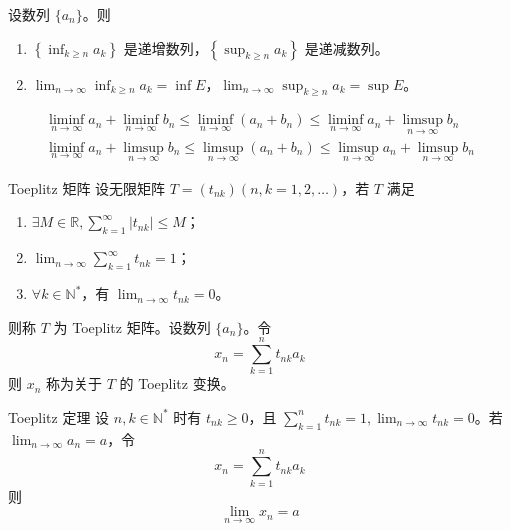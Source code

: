 \begin{theorem}
    设数列 $\{a_n\}$。则
    \begin{enumerate}[itemsep=0.5em]
        \item $\displaystyle \left\{\inf_{k \geqslant n} a_k\right\}$ 是递增数列，$\displaystyle \left\{\sup_{k \geqslant n} a_k\right\}$ 是递减数列。
        \item $\displaystyle \lim_{n \to \infty}\inf_{k \geqslant n} a_k = \inf E$，$\displaystyle \lim_{n \to \infty}\sup_{k \geqslant n} a_k = \sup E$。
    \end{enumerate}
\end{theorem}

\hfill

\begin{example}
    \begin{gather*}
        \liminf_{n \to \infty} a_n + \liminf_{n \to \infty} b_n \leqslant \liminf_{n \to \infty} (a_n + b_n) \leqslant \liminf_{n \to \infty} a_n + \limsup_{n \to \infty} b_n \\
        \liminf_{n \to \infty} a_n + \limsup_{n \to \infty} b_n \leqslant \limsup_{n \to \infty} (a_n + b_n) \leqslant \limsup_{n \to \infty} a_n + \limsup_{n \to \infty} b_n
    \end{gather*}
\end{example}

\hfill

\begin{definition}{Toeplitz 矩阵}
    设无限矩阵 $T = (t_{nk})(n, k = 1,2, \ldots)$，若 $T$ 满足
    \begin{enumerate}
        \item $\exists M \in \mathbb{R}, \displaystyle \sum_{k = 1}^{\infty} |t_{nk}| \leqslant M$；
        \item $\displaystyle \lim_{n \to \infty}\sum_{k = 1}^{\infty} t_{nk} = 1$；
        \item $\forall k \in \mathbb{N}^{*}$，有 $\displaystyle \lim_{n \to \infty} t_{nk} = 0$。
    \end{enumerate}
    则称 $T$ 为 Toeplitz 矩阵。设数列 $\{a_n\}$。令
    \[x_n = \sum_{k = 1}^{n} t_{nk}a_{k}\]
    则 $x_n$ 称为关于 $T$ 的 Toeplitz 变换。
\end{definition}

\begin{theorem}{Toeplitz 定理}
    设 $n, k \in \mathbb{N}^{*}$ 时有 $t_{nk} \geqslant 0$，且 $\displaystyle \sum_{k = 1}^{n} t_{nk} = 1, \lim_{n \to \infty} t_{nk} = 0$。若 $\displaystyle \lim_{n \to \infty} a_n = a$，令
    \[x_n = \sum_{k = 1}^{n} t_{nk}a_{k}\]
    则
    \[\lim_{n \to \infty} x_n = a\]
\end{theorem}

